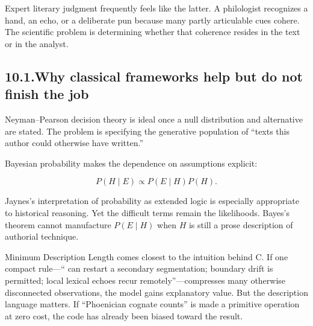 Expert literary judgment frequently feels like the latter.  A philologist recognizes a hand, an echo, or a deliberate pun because many partly articulable cues cohere.  The scientific problem is determining whether that coherence resides in the text or in the analyst.

\subsection*{10.1.\quad Why classical frameworks help but do not finish the job}


Neyman--Pearson decision theory is ideal once a null distribution and alternative are stated.\cite{NeymanPearson1933}  The problem is specifying the generative population of ``texts this author could otherwise have written.''

Bayesian probability makes the dependence on assumptions explicit:

\[
P(H\mid E) \propto P(E\mid H)P(H).
\]

Jaynes's interpretation of probability as extended logic is especially appropriate to historical reasoning.\cite{Jaynes2003}  Yet the difficult terms remain the likelihoods.  Bayes's theorem cannot manufacture \(P(E\mid H)\) when \(H\) is still a prose description of authorial technique.

Minimum Description Length comes closest to the intuition behind C.  If one compact rule---`` can restart a secondary segmentation; boundary drift is permitted; local lexical echoes recur remotely''---compresses many otherwise disconnected observations, the model gains explanatory value.\cite{Rissanen1978}  But the description language matters.  If ``Phoenician cognate counts'' is made a primitive operation at zero cost, the code has already been biased toward the result.

